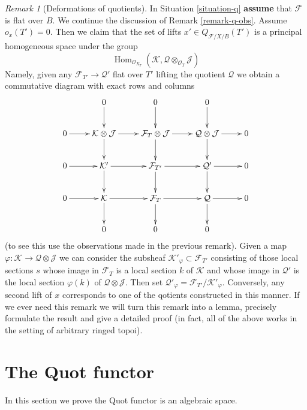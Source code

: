 \documentclass{stacks-project}
\theoremstyle{plain}
\theoremstyle{definition}
\theoremstyle{remark}
\newtheorem{remark}[subsection]{Remark}
\numberwithin{equation}{subsection}
\def\Hom{\mathop{\mathrm{Hom}}\nolimits}
\begin{document}
\begin{remark}[Deformations of quotients]
\label{remark-q-defos}
In Situation \ref{situation-q} {\bf assume} that $\mathcal{F}$ is flat
over $B$. We continue the discussion of Remark \ref{remark-q-obs}.
Assume $o_x(T') = 0$. Then we claim that the set of lifts
$x' \in Q_{\mathcal{F}/X/B}(T')$ is a principal homogeneous space
under the group
$$
\Hom_{\mathcal{O}_{X_T}}(\mathcal{K},
\mathcal{Q} \otimes_{\mathcal{O}_T} \mathcal{J})
$$
Namely, given any $\mathcal{F}_{T'} \to \mathcal{Q}'$ flat over $T'$
lifting the quotient $\mathcal{Q}$ we obtain a commutative diagram
with exact rows and columns
$$
\xymatrix{
& 0 \ar[d] & 0 \ar[d] & 0 \ar[d] \\
0 \ar[r] &
\mathcal{K} \otimes \mathcal{J} \ar[r] \ar[d] &
\mathcal{F}_T \otimes \mathcal{J} \ar[r] \ar[d] &
\mathcal{Q} \otimes \mathcal{J} \ar[r] \ar[d] &
0 \\
0 \ar[r] &
\mathcal{K}' \ar[r] \ar[d] &
\mathcal{F}_{T'} \ar[r] \ar[d] &
\mathcal{Q}' \ar[r] \ar[d] &
0 \\
0 \ar[r] &
\mathcal{K} \ar[d] \ar[r] &
\mathcal{F}_T \ar[d] \ar[r] &
\mathcal{Q} \ar[d] \ar[r] &
0 \\
& 0 & 0 & 0
}
$$
(to see this use the observations made in the previous remark).
Given a map $\varphi : \mathcal{K} \to \mathcal{Q} \otimes \mathcal{J}$
we can consider the subsheaf $\mathcal{K}'_\varphi \subset \mathcal{F}_{T'}$
consisting of those local sections $s$
whose image in $\mathcal{F}_T$ is a local section $k$ of $\mathcal{K}$
and whose image in $\mathcal{Q}'$ is the local section $\varphi(k)$ of
$\mathcal{Q} \otimes \mathcal{J}$. Then set
$\mathcal{Q}'_\varphi = \mathcal{F}_{T'}/\mathcal{K}'_\varphi$.
Conversely, any second lift of $x$ corresponds to one of the
qotients constructed in this manner. If we ever need this
remark we will turn this remark into a lemma, precisely formulate
the result and give a detailed proof (in fact, all of the above
works in the setting of arbitrary ringed topoi).
\end{remark}










\section{The Quot functor}
\label{section-quot}

\noindent
In this section we prove the Quot functor is an algebraic space.
\end{document}
